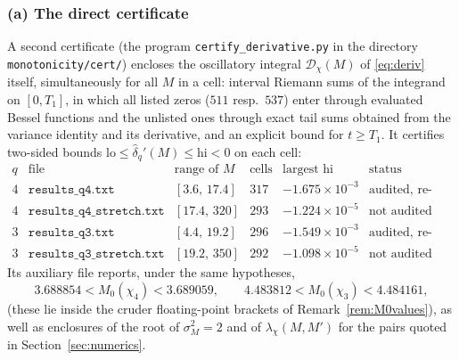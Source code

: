 \documentclass[11pt]{amsart}
\theoremstyle{definition}
\numberwithin{equation}{section}
\newcommand{\hd}{\widehat\delta}
\begin{document}
\subsubsection*{(a) The direct certificate}\label{subsec:cert}
A second certificate (the program \texttt{certify\_derivative.py}
in the directory \texttt{monotonicity/cert/}) encloses the
oscillatory integral
$\mathcal D_\chi(M)$ of \eqref{eq:deriv} itself, simultaneously for
all $M$ in a cell: interval Riemann sums of the integrand on
$[0,T_1]$, in which all listed zeros ($511$ resp.\ $537$) enter
through evaluated Bessel functions and the unlisted ones through
exact tail sums obtained from the variance identity and its
derivative, and an explicit bound for $t\ge T_1$. It certifies
two-sided bounds $\mathrm{lo}\le\hd_q'(M)\le\mathrm{hi}<0$ on each
cell:
\[
\begin{array}{c|l|c|c|c|l}
q & \text{file} & \text{range of }M & \text{cells} &
\text{largest }\mathrm{hi} & \text{status}\\\hline
4 & \texttt{results\_q4.txt} & [3.6,\,17.4] & 317 & -1.675\times10^{-3}
& \text{audited, re-proved}\\
4 & \texttt{results\_q4\_stretch.txt} & [17.4,\,320] & 293 & -1.224\times10^{-5}
& \text{not audited}\\
3 & \texttt{results\_q3.txt} & [4.4,\,19.2] & 296 & -1.549\times10^{-3}
& \text{audited, re-proved}\\
3 & \texttt{results\_q3\_stretch.txt} & [19.2,\,350] & 292 & -1.098\times10^{-5}
& \text{not audited}
\end{array}
\]
Its auxiliary file reports, under the same hypotheses,
\begin{equation}\label{eq:M0cert}
3.688854<M_0(\chi_4)<3.689059,\qquad
4.483812<M_0(\chi_3)<4.484161 ,
\end{equation}
(these lie inside the cruder floating-point brackets of
Remark~\ref{rem:M0values}), as well as enclosures of the root of
$\sigma_M^2=2$ and of $\lambda_\chi(M,M')$ for the pairs quoted in
Section~\ref{sec:numerics}.
\end{document}
